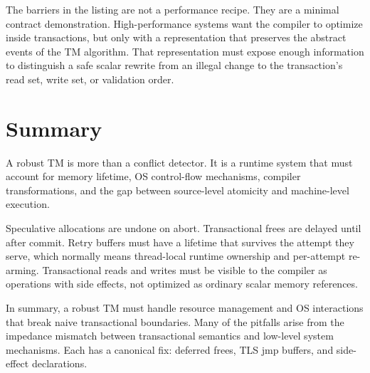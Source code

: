 The barriers in the listing are not a performance recipe.  They are a minimal contract demonstration.  High-performance systems want the compiler to optimize inside transactions, but only with a representation that preserves the abstract events of the TM algorithm.  That representation must expose enough information to distinguish a safe scalar rewrite from an illegal change to the transaction's read set, write set, or validation order.

\section{Summary}

A robust TM is more than a conflict detector.  It is a runtime system that must account for memory lifetime, OS control-flow mechanisms, compiler transformations, and the gap between source-level atomicity and machine-level execution.

Speculative allocations are undone on abort.  Transactional frees are delayed until after commit.  Retry buffers must have a lifetime that survives the attempt they serve, which normally means thread-local runtime ownership and per-attempt re-arming.  Transactional reads and writes must be visible to the compiler as operations with side effects, not optimized as ordinary scalar memory references.

In summary, a robust TM must handle resource management and OS interactions that break naive transactional boundaries. Many of the pitfalls arise from the impedance mismatch between transactional semantics and low-level system mechanisms. Each has a canonical fix: deferred frees, TLS jmp buffers, and side-effect declarations.

